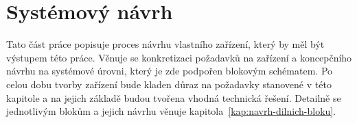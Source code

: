 \chapter{Systémový návrh}

Tato část práce popisuje proces návrhu vlastního zařízení, který by měl být výstupem této práce. Věnuje se konkretizaci požadavků na zařízení a koncepčního návrhu na systémové úrovni, který je zde podpořen blokovým schématem. Po celou dobu tvorby zařízení bude kladen důraz na požadavky stanovené v této kapitole a na jejich základě budou tvořena vhodná technická řešení.  Detailně se jednotlivým blokům a jejich návrhu věnuje kapitola~\ref{kap:navrh-dilnich-bloku}.














